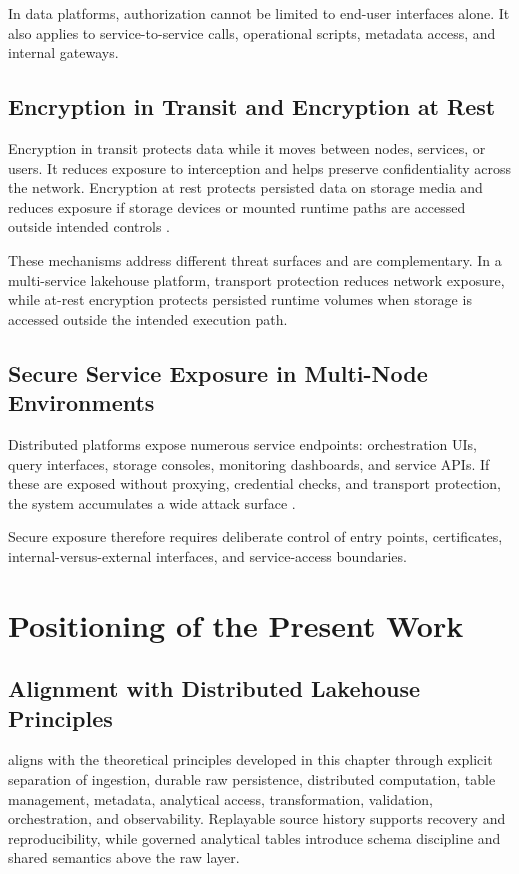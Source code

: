 In data platforms, authorization cannot be limited to end-user interfaces alone. It also applies to service-to-service calls, operational scripts, metadata access, and internal gateways.

\subsection{Encryption in Transit and Encryption at Rest}
Encryption in transit protects data while it moves between nodes, services, or users. It reduces exposure to interception and helps preserve confidentiality across the network. Encryption at rest protects persisted data on storage media and reduces exposure if storage devices or mounted runtime paths are accessed outside intended controls \cite{cryptsetup_docs}.

These mechanisms address different threat surfaces and are complementary. In a multi-service lakehouse platform, transport protection reduces network exposure, while at-rest encryption protects persisted runtime volumes when storage is accessed outside the intended execution path.

\subsection{Secure Service Exposure in Multi-Node Environments}
Distributed platforms expose numerous service endpoints: orchestration UIs, query interfaces, storage consoles, monitoring dashboards, and service APIs. If these are exposed without proxying, credential checks, and transport protection, the system accumulates a wide attack surface \cite{openssh_docs,prometheus_docs}.

Secure exposure therefore requires deliberate control of entry points, certificates, internal-versus-external interfaces, and service-access boundaries.

\section{Positioning of the Present Work}

\subsection{Alignment with Distributed Lakehouse Principles}
\projectname{} aligns with the theoretical principles developed in this chapter through explicit separation of ingestion, durable raw persistence, distributed computation, table management, metadata, analytical access, transformation, validation, orchestration, and observability. Replayable source history supports recovery and reproducibility, while governed analytical tables introduce schema discipline and shared semantics above the raw layer.

